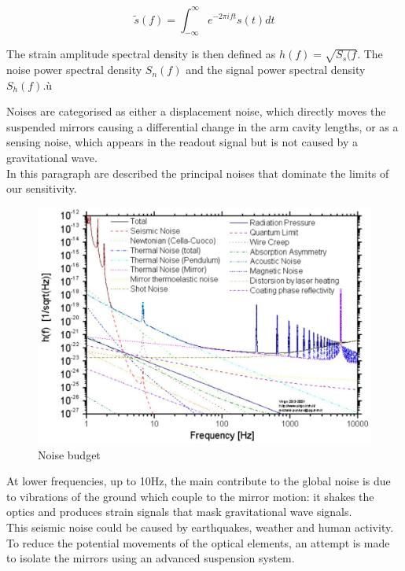 \documentclass[binding=0.6cm, LaM]{sapthesis}
\begin{document}
		\begin{equation}
                \tilde s(f) = \int^{\infty}_{-\infty} e^{-2 \pi ift} s(t)dt
		\end{equation}

	The strain amplitude spectral density is then defined as $h(f) = \sqrt{S_s(f}$.
	The noise power spectral density $S_n(f)$ and the signal power spectral density $S_h(f)$.ù
  
	Noises are categorised as either a displacement noise, which directly moves the suspended mirrors
        causing a differential change in the arm cavity lengths, or as a sensing noise,
        which appears in the readout signal but is not caused by a gravitational wave. \\
        In this paragraph are described the principal noises that dominate the limits of our sensitivity.

                \begin{figure}
                        \includegraphics[scale=0.3]{noisetwo}
                        \centering
                        \caption{Noise budget}
                        \label{fig:noisetwo}
                \end{figure}

        At lower frequencies, up to 10Hz, the main contribute to the global noise
        is due to vibrations of the ground which couple to the mirror motion: it shakes the optics and produces strain signals that mask gravitational wave signals. \\
        This seismic noise could be caused by earthquakes, weather and human activity.
        To reduce the potential movements of the optical elements, an attempt is made to
        isolate the mirrors using an advanced suspension system. \\
\end{document}
